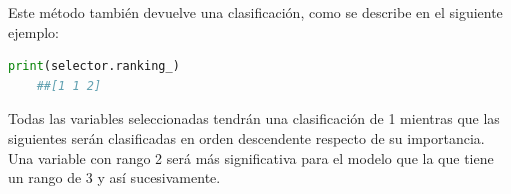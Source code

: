 Este método también devuelve una clasificación, como se describe en el siguiente ejemplo:
\begin{lstlisting}[language=Python]
	print(selector.ranking_)
	##[1 1 2]
\end{lstlisting}



\begin{observacion}
	Todas las variables seleccionadas tendrán una clasificación de 1 mientras que las siguientes serán
	clasificadas en orden descendente respecto de su importancia. Una variable con rango 2 será más
	significativa para el modelo que la que tiene un rango de 3 y así sucesivamente.
\end{observacion}


